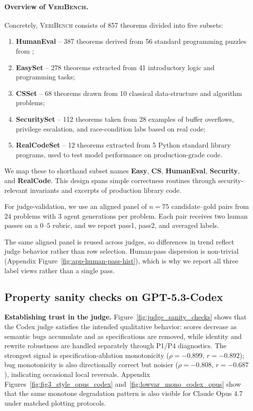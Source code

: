 \documentclass{article}
\begin{document}
\paragraph{Overview of \textsc{VeriBench}.}
Concretely, \textsc{VeriBench} consists of 857 theorems divided into five subsets:
\begin{enumerate}
  \item \textbf{HumanEval} -- 387 theorems derived from 56 standard programming puzzles from \citet{chen2021evaluating};
  \item \textbf{EasySet} -- 278 theorems extracted from 41 introductory logic and programming tasks;
  \item \textbf{CSSet} -- 68 theorems drawn from 10 classical data-structure and algorithm problems;
  \item \textbf{SecuritySet} -- 112 theorems taken from 28 examples of buffer overflows, privilege escalation, and race-condition labs based on real code;
  \item \textbf{RealCodeSet} -- 12 theorems extracted from 5 Python standard library programs, used to test model performance on production-grade code.
\end{enumerate}
We map these to shorthand subset names \textbf{Easy}, \textbf{CS}, \textbf{HumanEval}, \textbf{Security}, and \textbf{RealCode}. This design spans simple correctness routines through security-relevant invariants and excerpts of production library code.

For judge-validation, we use an aligned panel of \(n=75\) candidate--gold pairs from \(24\) problems with \(3\) agent generations per problem. Each pair receives two human passes on a \(0\)--\(5\) rubric, and we report pass1, pass2, and averaged labels.

The same aligned panel is reused across judges, so differences in trend reflect judge behavior rather than row selection. Human-pass dispersion is non-trivial (Appendix Figure~\ref{fig:app-human-pass-hist}), which is why we report all three label views rather than a single pass.

\subsection{Property sanity checks on GPT-5.3-Codex}
\textbf{Establishing trust in the judge.} Figure~\ref{fig:judge_sanity_checks} shows that the Codex judge satisfies the intended qualitative behavior: scores decrease as semantic bugs accumulate and as specifications are removed, while identity and rewrite robustness are handled separately through P1/P4 diagnostics. The strongest signal is specification-ablation monotonicity (\(\rho=-0.899\), \(r=-0.892\)); bug monotonicity is also directionally correct but noisier (\(\rho=-0.808\), \(r=-0.687\)), indicating occasional local reversals. Appendix Figures~\ref{fig:fig3_style_opus_codex} and~\ref{fig:lowvar_mono_codex_opus} show that the same monotone degradation pattern is also visible for Claude Opus 4.7 under matched plotting protocols.
\end{document}
